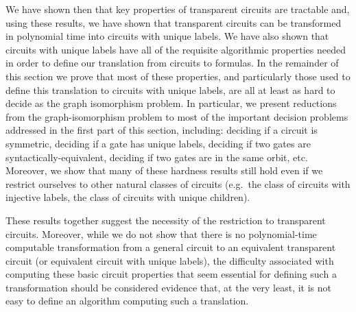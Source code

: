 \documentclass[../paper.tex]{subfiles}
\begin{document}

We have shown then that key properties of transparent circuits are
tractable and, using these results, we have shown that
transparent circuits can be transformed in polynomial time into circuits with
unique labels. We have also shown that circuits with unique labels have all of
the requisite algorithmic properties needed in order to define our translation
from circuits to formulas. In the remainder of this section we prove that most
of these properties, and particularly those used to define this translation to
circuits with unique labels, are all at least as hard to decide as the graph
isomorphism problem. In particular, we present reductions from the
graph-isomorphism problem to most of the important decision problems addressed
in the first part of this section, including: deciding if a circuit is
symmetric, deciding if a gate has unique labels, deciding if two gates are
syntactically-equivalent, deciding if two gates are in the same orbit, etc.
Moreover, we show that many of these hardness results still hold even if we
restrict ourselves to other natural classes of circuits (e.g.\ the class of
circuits with injective labels, the class of circuits with unique children).

These results together suggest the necessity of the restriction to transparent
circuits. Moreover, while we do not show that there is no polynomial-time
computable transformation from a general circuit to an equivalent transparent
circuit (or equivalent circuit with unique labels), the difficulty associated
with computing these basic circuit properties that seem essential for defining
such a transformation should be considered evidence that, at the very least, it
is not easy to define an algorithm computing such a translation.

\end{document}
